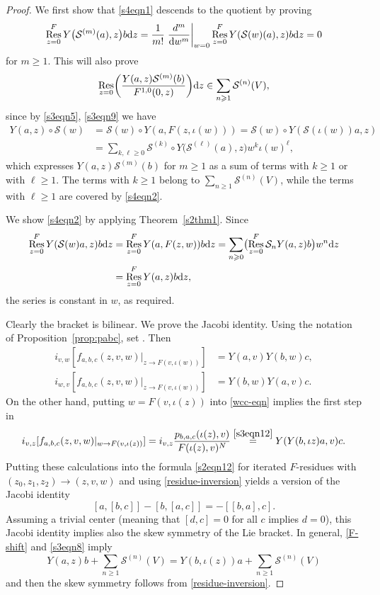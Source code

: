 \documentclass[pdftex]{sigma}
\numberwithin{equation}{section}
\theoremstyle{definition}
\DeclareMathOperator\Res{Res}
\begin{document}
\begin{proof}
We first show that \eqref{s4eqn1} descends to the quotient by proving
\begin{equation}
\label{s4eqn2}
\Res^F_{z=0} Y\bigl(\mathcal{S}^{(m)}(a),z\bigr)b {\rm d}z=\frac{1}{m!}\left.\frac{d^m}{{\rm d}w^m}\right|_{w=0} \Res_{z=0}^F Y(\mathcal{S}(w)(a),z)b {\rm d}z
=0
\end{equation}
for $m\geqslant1$. This will also prove
\[
 \Res_{z=0}\biggl(\frac{Y(a,z)\mathcal{S}^{(m)}(b)}{F^{1,0}(0,z)}\biggr){\rm d}z\in\sum_{n\geqslant1}\mathcal{S}^{(n)}(V),
\]
since by \eqref{s3eqn5}, \eqref{s3eqn9} we have
\begin{align*}
Y(a,z)\circ\mathcal{S}(w)&=\mathcal{S}(w)\circ Y(a,F(z,\iota(w)))=\mathcal{S}(w)\circ Y(\mathcal{S}(\iota(w))a,z)\\
&=\sum_{k,\ell\geqslant0} \mathcal{S}^{(k)}\circ Y\big(\mathcal{S}^{(\ell)}(a),z\big)w^k\iota(w)^\ell,
\end{align*}
which expresses $Y(a,z)\mathcal{S}^{(m)}(b)$ for $m\geqslant 1$ as a sum of terms with $k\geqslant1$ or with $\ell\geqslant1$. The terms with $k\geqslant1$ belong to $\sum_{n\geqslant1}\mathcal{S}^{(n)}(V)$, while the terms with $\ell\geqslant1$ are covered by \eqref{s4eqn2}.

We show \eqref{s4eqn2} by applying Theorem~\ref{s2thm1}. Since
\begin{align*}
 \Res_{z=0}^F Y(\mathcal{S}(w)a,z)b {\rm d}z&=\Res_{z=0}^F Y(a,F(z,w))b {\rm d}z=\sum_{n\geqslant0}\bigl(\Res_{z=0}^F\mathcal{S}_n Y(a,z)b\bigr) w^n {\rm d}z\\
 &=\Res_{z=0}^F Y(a,z)b {\rm d}z,
\end{align*}
the series is constant in $w$, as required.

Clearly the bracket is bilinear. We prove the Jacobi identity. Using the notation of Proposition~\ref{prop:pabc}, set . Then
\begin{align*}
 i_{v,w}[f_{a,b,c}(z,v,w)|_{z\to F(v,\iota(w))}]&=Y(a,v)Y(b,w)c,\\
 i_{w,v}[f_{a,b,c}(z,v,w)|_{z\to F(v,\iota(w))}]&=Y(b,w)Y(a,v)c.
\end{align*}
On the other hand, putting $w=F(v,\iota(z))$ into \eqref{wcc-eqn} implies the first step in
\[
 i_{v,z}[f_{a,b,c}(z,v,w)|_{w\to F(v,\iota(z))}]=i_{v,z}\frac{p_{b,a,c}(\iota(z),v)}{F(\iota(z),v)^N}
 \overset{\eqref{s3eqn12}}{=} Y(Y(b,\iota z)a,v)c.
\]
Putting these calculations into the formula \eqref{s2eqn12} for iterated $F$-residues with $(z_0,z_1,z_2)\to(z,v,w)$ and using \eqref{residue-inversion} yields a version of the Jacobi identity
\[
 [a,[b,c]]-[b,[a,c]]=-[[b,a],c].
\]
Assuming a trivial center (meaning that $[d,c]=0$ for all $c$ implies $d=0$), this Jacobi identity implies also the skew symmetry of the Lie bracket. In general, \eqref{F-shift} and \eqref{s3eqn8} imply
\[
 Y(a,z)b + \sum_{n\geqslant1}\mathcal{S}^{(n)}(V) = Y(b,\iota(z))a + \sum_{n\geqslant1}\mathcal{S}^{(n)}(V)
\]
and then the skew symmetry follows from \eqref{residue-inversion}.
\end{proof}
\end{document}
